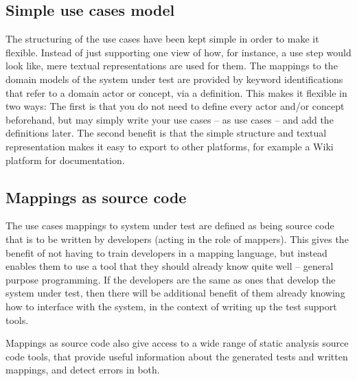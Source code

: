\subsection{Simple use cases model}
The structuring of the use cases have been kept simple in order to make it flexible. Instead of just supporting one view of how, for instance, a use step would look like, mere textual representations are used for them. The mappings to the domain models of the system under test are provided by keyword identifications that refer to a domain actor or concept, via a definition. This makes it flexible in two ways: The first is that you do not need to define every actor and/or concept beforehand, but may simply write your use cases -- as use cases -- and add the definitions later. The second benefit is that the simple structure and textual representation makes it easy to export to other platforms, for example a Wiki platform for documentation.

\subsection{Mappings as source code}
The use cases mappings to system under test are defined as being source code that is to be written by developers (acting in the role of mappers). This gives the benefit of not having to train developers in a mapping language, but instead enables them to use a tool that they should already know quite well -- general purpose programming. If the developers are the same as ones that develop the system under test, then there will be additional benefit of them already knowing how to interface with the system, in the context of writing up the test support tools.\medskip

\noindent Mappings as source code also give access to a wide range of static analysis source code tools, that provide useful information about the generated tests and written mappings, and detect errors in both. 

